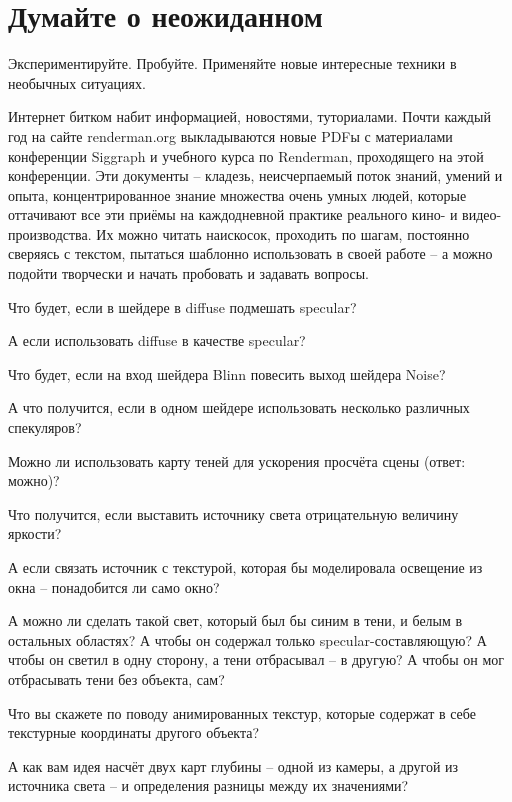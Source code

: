 \chapter*{Думайте о неожиданном}
  

 Экспериментируйте. Пробуйте. Применяйте новые
    интересные техники в необычных ситуациях. 
  

 Интернет битком набит информацией, новостями,
    туториалами. Почти каждый год на сайте renderman.org выкладываются
    новые PDFы с материалами конференции Siggraph и учебного курса по
    Renderman, проходящего на этой конференции. Эти документы – кладезь, неисчерпаемый
    поток знаний, умений и опыта, концентрированное знание множества
    очень умных людей, которые оттачивают все эти приёмы на
    каждодневной практике реального кино- и видео-производства. Их
    можно читать наискосок, проходить по шагам, постоянно сверяясь с
    текстом, пытаться шаблонно использовать в своей работе – а можно
    подойти творчески и начать пробовать и задавать вопросы.
  

 Что будет, если в шейдере в diffuse подмешать
    specular?
  

 А если использовать diffuse в качестве
    specular?
  

 Что будет, если на вход шейдера Blinn повесить
    выход шейдера Noise?
  

 А что получится, если в одном шейдере использовать
    несколько различных спекуляров?
  

 Можно ли использовать карту теней для ускорения
    просчёта сцены (ответ: можно)?
  

 Что получится, если выставить источнику света
    отрицательную величину яркости?
  

 А если связать источник с текстурой, которая бы
    моделировала освещение из окна – понадобится ли само
    окно?
  

 А можно ли сделать такой свет, который был бы синим
    в тени, и белым в остальных областях? А чтобы он содержал только
    specular-составляющую? А чтобы он светил в одну сторону, а тени
    отбрасывал – в другую? А чтобы он мог отбрасывать тени без объекта,
    сам?
  

 Что вы скажете по поводу анимированных текстур,
    которые содержат в себе текстурные координаты другого
    объекта?
  

 А как вам идея насчёт двух карт глубины – одной из
    камеры, а другой из источника света – и определения разницы между
    их значениями?
  

